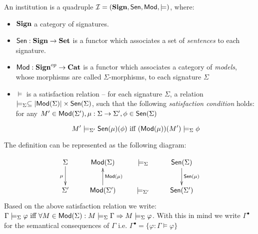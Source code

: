 \documentclass[10pt]{article}
\begin{document}
\begin{definition}
An institution is a quadruple ${\mathcal{I}} = ({\bf Sign},{\sf {Sen}},{\sf {Mod}},\models)$, where:
	\begin{itemize}
\item ${\bf Sign}$ a category of signatures.  
\item ${\sf {Sen}}: {\bf Sign} \to {\bf Set}$ is a functor which associates a set of {\it sentences} to each signature.
\item ${\sf {Mod}}:{\bf Sign}^{op} \to {\bf Cat}$ is a functor which associates a
category of {\it models}, whose morphisms are called $\Sigma$-morphisms, to
each signature $\Sigma$
\item $\models$ is a satisfaction relation -- for each signature $\Sigma$, a relation
 $\models_{\Sigma} \subseteq |{\sf {Mod}}(\Sigma)| \times
{\sf {Sen}}(\Sigma)$, such that the following {\it satisfaction condition} holds:
for any $M' \in {\sf {Mod}}(\Sigma'), \mu: \Sigma \to \Sigma' , \phi \in {\sf {Sen}}(\Sigma)$
 
  \[ M' \models_{\Sigma'} {\sf {Sen}}(\mu)(\phi) \mbox{ iff } ({\sf {Mod}}(\mu))(M') \models_{\Sigma} \phi\]
	\end{itemize}
\end{definition}
%
The definition can be represented as the following diagram:

\[\xymatrix{
	\Sigma \ar[d]_{\mu}
		& {\Mod}(\Sigma)
			& \models_{\Sigma}
				& \Sen(\Sigma) \ar[d]^{\Sen(\mu)}	\\
	\Sigma'
		& {\Mod}(\Sigma') \ar[u]_{{\Mod}(\mu)}
			& \models_{\Sigma'}
				& \Sen(\Sigma')			\\
								}
\]
Based on the above satisfaction relation we write: $\Gamma \models_{\Sigma}
 \varphi \mbox{ iff } \forall M \in {\sf {Mod}}(\Sigma): M \models_{\Sigma} \Gamma
 \Rightarrow M \models_{\Sigma} \varphi $.  With this in mind we write
 $\Gamma^{\bullet}$ for the semantical consequences of $\Gamma$
 i.e. $\Gamma^{\bullet} = \{ \varphi: \Gamma \models \varphi \}$
 
\end{document}
